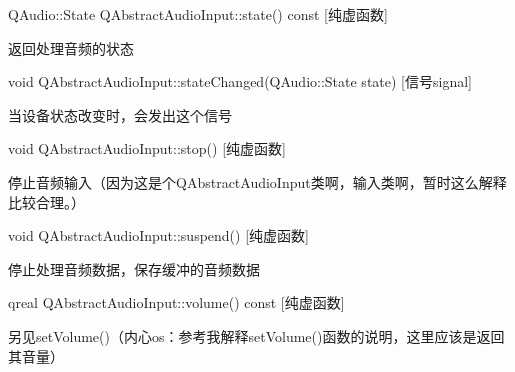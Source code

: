 QAudio::State QAbstractAudioInput::state() const [纯虚函数]

返回处理音频的状态

void QAbstractAudioInput::stateChanged(QAudio::State state) [信号signal]

当设备状态改变时，会发出这个信号

void QAbstractAudioInput::stop() [纯虚函数]

停止音频输入（因为这是个QAbstractAudioInput类啊，输入类啊，暂时这么解释比较合理。）

void QAbstractAudioInput::suspend() [纯虚函数]

停止处理音频数据，保存缓冲的音频数据

qreal QAbstractAudioInput::volume() const [纯虚函数]

另见setVolume()（内心os：参考我解释setVolume()函数的说明，这里应该是返回其音量）

